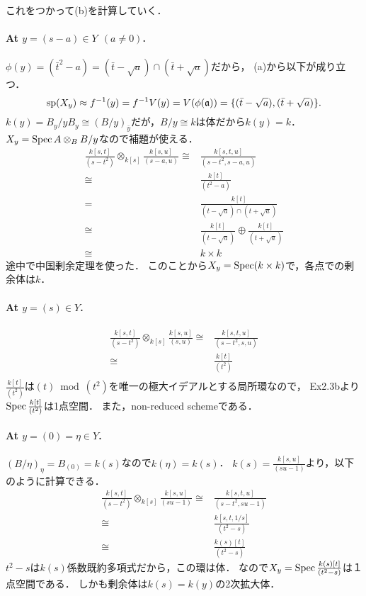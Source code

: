 \documentclass[a4paper]{jsarticle}
\newcommand{\basesp}{\operatorname{sp}}
\begin{document}
    これをつかって(b)を計算していく．
    \paragraph{At $y=(s-a) \in Y ~~(a \neq 0)$.}
    $\phi(y)=(\bar{t}^2-a)=(\bar{t}-\sqrt{a}) \cap (\bar{t}+\sqrt{a})$だから，
    (a)から以下が成り立つ．
    \[
        \basesp(X_y) \homeo
        f^{-1}(y)=f^{-1}V(y)=V(\phi(\I{a}))=\{ (\bar{t}-\sqrt{a}), (\bar{t}+\sqrt{a}) \}.
    \]
    $k(y)=B_y/yB_y \cong (B/y)_{\bar{y}}$だが，$B/y \cong k$は体だから$k(y)=k$．
    $X_y=\operatorname{Spec} A \otimes_B B/y$なので補題が使える．
    \begin{align*}
        \frac{k[s,t]}{(s-t^2)} \otimes_{k[s]} \frac{k[s,u]}{(s-a,u)}
        \cong& \frac{k[s,t,u]}{(s-t^2, s-a, u)} \\
        \cong& \frac{k[t]}{(t^2-a)} \\
        =& \frac{k[t]}{(t-\sqrt{a}) \cap (t+\sqrt{a})} \\
        \cong& \frac{k[t]}{(t-\sqrt{a})} \oplus \frac{k[t]}{(t+\sqrt{a})} \\
        \cong& k \times k
    \end{align*}
    途中で中国剰余定理を使った．
    このことから$X_y=\operatorname{Spec} (k \times k)$で，各点での剰余体は$k$．

    \paragraph{At $y=(s) \in Y$.}
    \begin{align*}
        \frac{k[s,t]}{(s-t^2)} \otimes_{k[s]} \frac{k[s,u]}{(s,u)}
        \cong& \frac{k[s,t,u]}{(s-t^2, s, u)} \\
        \cong& \frac{k[t]}{(t^2)} \\
    \end{align*}
    $\frac{k[t]}{(t^2)}$は$(t) \bmod (t^2)$を唯一の極大イデアルとする局所環なので，
    Ex2.3bより$\operatorname{Spec} \frac{k[t]}{(t^2)}$は1点空間．
    また，non-reduced schemeである．

    \paragraph{At $y=(0)=\eta \in Y$.}
    $(B/\eta)_{\eta}=B_{(0)}=k(s)$なので$k(\eta)=k(s)$．
    $k(s)=\frac{k[s,u]}{(su-1)}$より，以下のように計算できる．
    \begin{align*}
        \frac{k[s,t]}{(s-t^2)} \otimes_{k[s]} \frac{k[s,u]}{(su-1)}
        \cong& \frac{k[s,t,u]}{(s-t^2, su-1)} \\
        \cong& \frac{k[s,t,1/s]}{(t^2-s)} \\
        \cong& \frac{k(s)[t]}{(t^2-s)}
    \end{align*}
    $t^2-s$は$k(s)$係数既約多項式だから，この環は体．
    なので$X_y=\operatorname{Spec} \frac{k(s)[t]}{(t^2-s)}$は１点空間である．
    しかも剰余体は$k(s)=k(y)$の2次拡大体．
\end{document}
